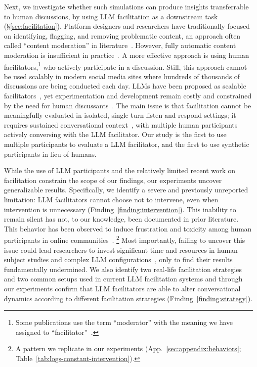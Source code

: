 Next, we investigate whether such simulations can produce insights transferrable to human discussions, by using LLM facilitation as a downstream task (\S\ref{sec:facilitation}). Platform designers and researchers have traditionally focused on identifying, flagging, and removing problematic content, an approach often called ``content moderation'' in literature~\cite{seering_self_moderation,cresci_pesonalized_interventions}. However, fully automatic content moderation is insufficient in practice~\cite{horta_automated_moderation, schaffner_community_guidelines, small-polis-llm, korre2025evaluation}. A more effective approach is using human facilitators,\footnote{Some publications use the term ``moderator'' with the meaning we have assigned to ``facilitator''~\cite{korre2025evaluation}.} who actively participate in a discussion. Still, this approach cannot be used scalably in modern social media sites where hundreds of thousands of discussions are being conducted each day. LLMs have been proposed as scalable facilitators~\cite{korre2025evaluation, small-polis-llm}, yet experimentation and development remain costly and constrained by the need for human discussants~\cite{rossi_2024, small-polis-llm}. The main issue is that facilitation cannot be meaningfully evaluated in isolated, single-turn listen-and-respond settings; it requires sustained conversational context~\cite{cho-etal-2024-language}, with multiple human participants actively conversing with the LLM facilitator. Our study is the first to use multiple participants to evaluate a LLM facilitator, and the first to use synthetic participants in lieu of humans. 

While the use of LLM participants and the relatively limited recent work on facilitation constrain the scope of our findings, our experiments uncover generalizable results. Specifically, we identify a severe and previously unreported limitation: LLM facilitators cannot choose not to intervene, even when intervention is unnecessary (Finding~\ref{finding:intervention}). This inability to remain silent has not, to our knowledge, been documented in prior literature. This behavior has been observed to induce frustration and toxicity among human participants in online communities~\cite{korre2025evaluation}. \footnote{A pattern we replicate in our experiments (App.~\ref{sec:appendix:behaviors}; Table~\ref{tab:logs-constant-intervention}).} Most importantly, failing to uncover this issue could lead researchers to invest significant time and resources in human-subject studies and complex LLM configurations~\cite{korre2025evaluation,small-polis-llm}, only to find their results fundamentally undermined. 
We also identify two real-life facilitation strategies and two common setups used in current LLM facilitation systems and through our experiments confirm that LLM facilitators are able to alter conversational dynamics according to different facilitation strategies (Finding~\ref{finding:strategy}).

